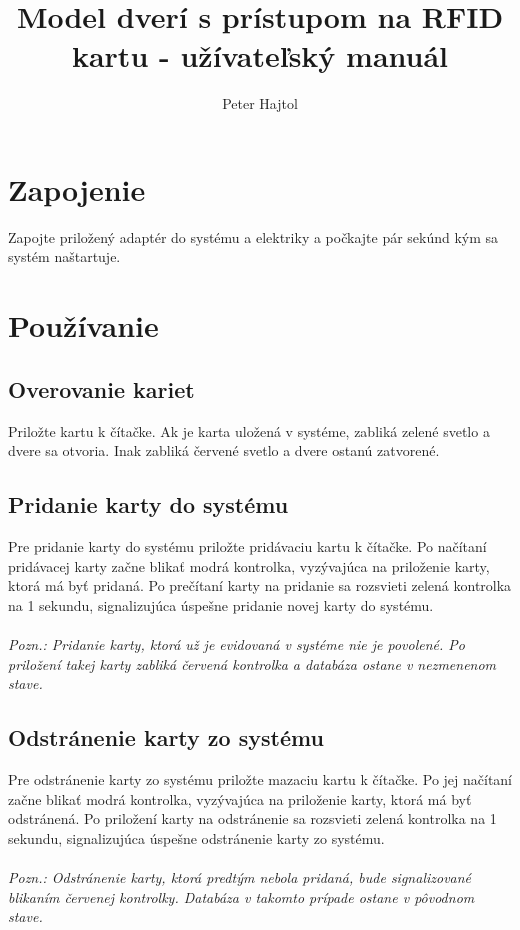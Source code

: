 \documentclass[a4paper]{article}
\title{Model dverí s prístupom na RFID kartu - užívateľský manuál}
\author{Peter Hajtol}
\begin{document}
\maketitle




\section{Zapojenie}

Zapojte priložený adaptér do systému a elektriky a počkajte pár sekúnd kým sa systém naštartuje.




\section{Používanie}

\subsection{Overovanie kariet}
Priložte kartu k čítačke. Ak je karta uložená v systéme, zabliká zelené svetlo a dvere sa otvoria. Inak zabliká červené svetlo a dvere ostanú zatvorené.

\subsection{Pridanie karty do systému}
Pre pridanie karty do systému priložte pridávaciu kartu k čítačke. Po načítaní pridávacej karty začne blikať modrá kontrolka, vyzývajúca na priloženie karty, ktorá má byť pridaná. Po prečítaní karty na pridanie sa rozsvieti zelená kontrolka na 1 sekundu, signalizujúca úspešne pridanie novej karty do systému.
\\\\
\textit{Pozn.: Pridanie karty, ktorá už je evidovaná v systéme nie je povolené. Po priložení takej karty zabliká červená kontrolka a databáza ostane v nezmenenom stave.}

\subsection{Odstránenie karty zo systému}
Pre odstránenie karty zo systému priložte mazaciu kartu k čítačke. Po jej načítaní začne blikať modrá kontrolka, vyzývajúca na priloženie karty, ktorá má byť odstránená. Po priložení karty na odstránenie sa rozsvieti zelená kontrolka na 1 sekundu, signalizujúca úspešne odstránenie karty zo systému.
\\\\
\textit{Pozn.: Odstránenie karty, ktorá predtým nebola pridaná, bude signalizované blikaním červenej kontrolky. Databáza v takomto prípade ostane v pôvodnom stave.}
\end{document}
